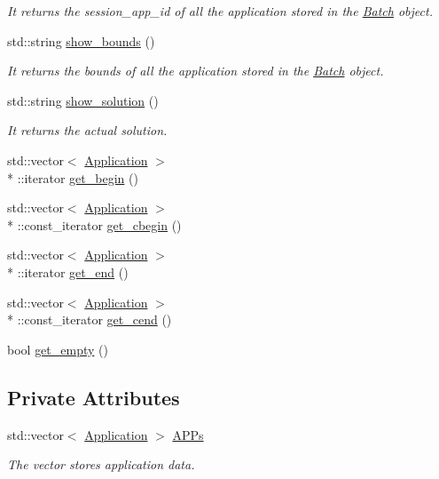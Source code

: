 \begin{DoxyCompactItemize}
\begin{DoxyCompactList}\small\item\em It returns the session\-\_\-app\-\_\-id of all the application stored in the \hyperlink{classBatch}{Batch} object. \end{DoxyCompactList}\item 
std\-::string \hyperlink{classBatch_a6e3c7278556780b9fb1e530c740b41de}{show\-\_\-bounds} ()
\begin{DoxyCompactList}\small\item\em It returns the bounds of all the application stored in the \hyperlink{classBatch}{Batch} object. \end{DoxyCompactList}\item 
std\-::string \hyperlink{classBatch_a54f580f3d93657bdf72420d338551087}{show\-\_\-solution} ()
\begin{DoxyCompactList}\small\item\em It returns the actual solution. \end{DoxyCompactList}\item 
std\-::vector$<$ \hyperlink{classApplication}{Application} $>$\\*
\-::iterator \hyperlink{classBatch_a2e6d4bba1cc89e2ecb55e3aca7228046}{get\-\_\-begin} ()
\item 
std\-::vector$<$ \hyperlink{classApplication}{Application} $>$\\*
\-::const\-\_\-iterator \hyperlink{classBatch_af6cccfc68c9a29acc008b5f316dc3abc}{get\-\_\-cbegin} ()
\item 
std\-::vector$<$ \hyperlink{classApplication}{Application} $>$\\*
\-::iterator \hyperlink{classBatch_a5585c86c7f6545178d0b0e0a82d93fa3}{get\-\_\-end} ()
\item 
std\-::vector$<$ \hyperlink{classApplication}{Application} $>$\\*
\-::const\-\_\-iterator \hyperlink{classBatch_a69e1aff3a876d8e96989b94ad5f2e311}{get\-\_\-cend} ()
\item 
bool \hyperlink{classBatch_a8bbd81b72e695e1fc2c1a1687d72e71a}{get\-\_\-empty} ()
\end{DoxyCompactItemize}
\subsection*{Private Attributes}
\begin{DoxyCompactItemize}
\item 
std\-::vector$<$ \hyperlink{classApplication}{Application} $>$ \hyperlink{classBatch_a757bf1a36fee46b1b47263ab4a59c560}{A\-P\-Ps}
\begin{DoxyCompactList}\small\item\em The vector stores application data. \end{DoxyCompactList}\end{DoxyCompactItemize}


